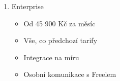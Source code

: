 \begin{enumerate}
\begin{itemize}
\begin{itemize}
	      	      	\item Do 10 uživatelů: 2 690 Kč za měsíc
	      	      	\item Do 15 uživatelů: 3 590 Kč za měsíc
	      	      	\item Do 20 uživatelů: 4 180 Kč za měsíc
	      	      	\item Nad 20 uživatelů: 4 180 Kč + 209 Kč za 21. uživatele a dál\footnote{Za každých dalších 20 uživatelů se snižuje poplatek za nadbytečné uživatele až na 160 Kč za uživatele}
	      	      \end{itemize}
	      	\item Vše, co předchozí tarify
	      	\item Vlastní role
	      	\item Rozšíření vazeb
	      	\item Přehledy
	      	\item Rozšířené zabezpečení
	      	\item Ganttův diagram
	      \end{itemize}
	\item Enterprise
	      \begin{itemize}
	      	\item Od 45 900 Kč za měsíc
	      	\item Vše, co předchozí tarify
	      	\item Integrace na míru
	      	\item Osobní komunikace s Freelem
	      \end{itemize}
\end{enumerate}